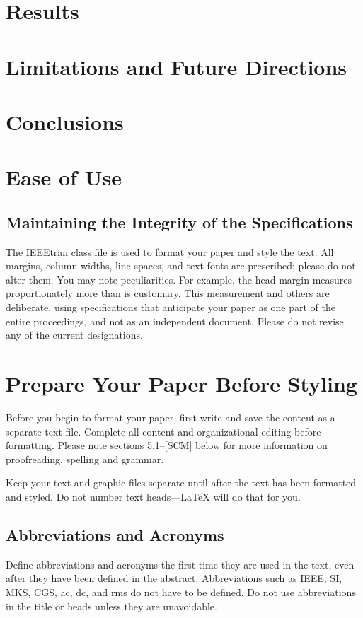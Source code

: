 \documentclass[conference]{IEEEtran}
\begin{document}
\section{Results}

\section{Limitations and Future Directions}

\section{Conclusions}

\section{Ease of Use}

\subsection{Maintaining the Integrity of the Specifications}

The IEEEtran class file is used to format your paper and style the text. All margins, 
column widths, line spaces, and text fonts are prescribed; please do not 
alter them. You may note peculiarities. For example, the head margin
measures proportionately more than is customary. This measurement 
and others are deliberate, using specifications that anticipate your paper 
as one part of the entire proceedings, and not as an independent document. 
Please do not revise any of the current designations.

\section{Prepare Your Paper Before Styling}
Before you begin to format your paper, first write and save the content as a 
separate text file. Complete all content and organizational editing before 
formatting. Please note sections \ref{AA}--\ref{SCM} below for more information on 
proofreading, spelling and grammar.

Keep your text and graphic files separate until after the text has been 
formatted and styled. Do not number text heads---{\LaTeX} will do that 
for you.

\subsection{Abbreviations and Acronyms}\label{AA}
Define abbreviations and acronyms the first time they are used in the text, 
even after they have been defined in the abstract. Abbreviations such as 
IEEE, SI, MKS, CGS, ac, dc, and rms do not have to be defined. Do not use 
abbreviations in the title or heads unless they are unavoidable.
\end{document}
